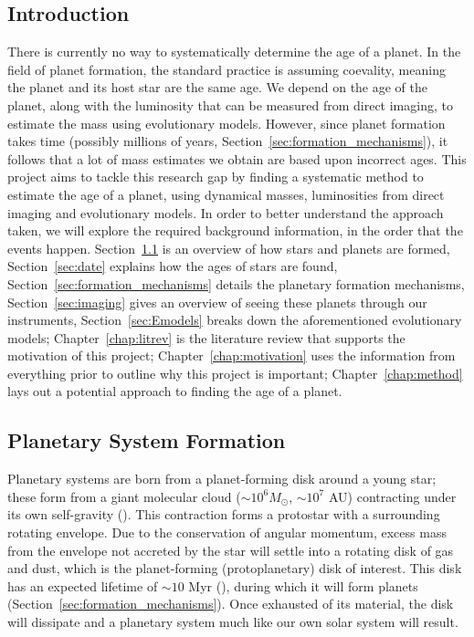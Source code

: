 \documentclass[11pt]{report}
\begin{document}
\begin{mainf} %
\chapter{Introduction}
There is currently no way to systematically determine the age of a planet. In the field of planet formation, the standard practice is assuming coevality, meaning the planet and its host star
are the same age. We depend on the age of the planet, along with the luminosity that can be measured from direct imaging, to estimate the mass using evolutionary models. 
However, since planet formation takes time (possibly millions of years, Section~\ref{sec:formation_mechanisms}), it follows that a lot of mass estimates we obtain are based upon incorrect ages. 
This project aims to tackle this research gap by finding a systematic method to estimate the age of a planet, using dynamical masses, luminosities from direct imaging and evolutionary models. 
In order to better understand the approach taken, we will explore the required background information, in the order that the events happen. Section~\ref{sec:formation} is an overview of how stars and planets are formed, 
Section~\ref{sec:date} explains how the ages of stars are found,
Section~\ref{sec:formation_mechanisms} details the planetary formation mechanisms, Section~\ref{sec:imaging} gives an overview of seeing these planets through our instruments, Section~\ref{sec:Emodels} breaks down the aforementioned evolutionary models; 
Chapter~\ref{chap:litrev} is the literature review that supports the motivation of this project; 
Chapter~\ref{chap:motivation} uses the information from everything prior to outline why this project is important;
Chapter~\ref{chap:method} lays out a potential approach to finding the age of a planet.


\section{Planetary System Formation}\label{sec:formation}
Planetary systems are born from a planet-forming disk around a young star; these form from a giant molecular cloud ($\sim 10^6M_\odot$, $\sim10^7$ AU) contracting under its own self-gravity (\citealp{Shu1987}).
This contraction forms a protostar with a surrounding rotating envelope. Due to the conservation of angular momentum, excess mass from the envelope not accreted by the star will settle into a rotating disk
of gas and dust, which is the planet-forming (protoplanetary) disk of interest. This disk has an expected lifetime of $\sim 10$ Myr (\citealp{Strom1993}), during which it will form planets (Section~\ref{sec:formation_mechanisms}). Once exhausted of its material,
the disk will dissipate and a planetary system much like our own solar system will result.


\end{mainf}
\end{document}
